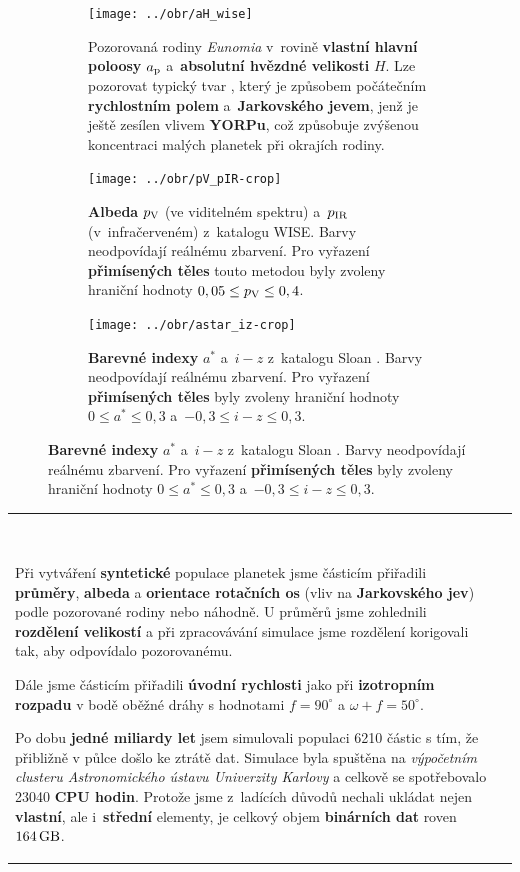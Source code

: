 \documentclass{beamer}
\newlength{\vyska}
\newlength{\vyskaB}
\newlength{\main}
\begin{document}
\begin{frame}
\begin{columns}[t]
\begin{column}{\main}
\begin{tcolorbox}[title=Výsledky\phantom{Úy},height=\vyskaB]
\begin{figure}[!htb]
\begin{subfigure}[b]{0.3\textwidth}
			\label{fig:ae_ai_wise}
		\end{subfigure}
		\begin{subfigure}[b]{0.26\textwidth}
			\centering
			\texttt{[image: ../obr/aH\_wise]}
			\caption{Pozorovaná rodiny \textit{Eunomia} v~rovině \textbf{vlastní hlavní poloosy} $a_{\rm p}$ a~\textbf{absolutní hvězdné velikosti} $H$. Lze pozorovat typický tvar , který je způsobem počátečním \textbf{rychlostním polem} a~\textbf{Jarkovského jevem}, jenž je ještě zesílen vlivem \textbf{YORPu}, což způsobuje zvýšenou koncentraci malých planetek při okrajích rodiny.}
		\end{subfigure}
		\begin{subfigure}[b]{0.2\textwidth}
			\centering
			\texttt{[image: ../obr/pV\_pIR-crop]}
			\caption{\textbf{Albeda} $p_{\rm V}$ (ve viditelném spektru) a~$p_{\rm IR}$ (v~infračerveném) z~katalogu WISE. Barvy neodpovídají reálnému zbarvení. Pro vyřazení \textbf{přimísených těles} touto metodou byly zvoleny hraniční hodnoty $0,05 \leq p_{\rm V} \leq 0,4$.}
		\end{subfigure}
		\begin{subfigure}[b]{0.2\textwidth}
			\centering
			\texttt{[image: ../obr/astar\_iz-crop]}
			\caption{\textbf{Barevné indexy} $a^*$ a~$i-z$ z~katalogu Sloan \cite{ivezic01}. Barvy neodpovídají reálnému zbarvení. Pro vyřazení \textbf{přimísených těles} byly zvoleny hraniční hodnoty $0\leq a^* \leq 0,3$ a~$-0,3\leq i-z \leq 0,3$.
}
		\end{subfigure}
	\end{figure}

	\begin{tabularx}{\textwidth}{p{}X}

\

Při vytváření \textbf{syntetické} populace planetek jsme částicím přiřadili \textbf{průměry}, \textbf{albeda} a \textbf{orientace rotačních os} (vliv na \textbf{Jarkovského jev}) podle pozorované rodiny nebo náhodně. U průměrů jsme zohlednili \textbf{rozdělení velikostí} a při zpracovávání simulace jsme rozdělení korigovali tak, aby odpovídalo pozorovanému.

Dále jsme částicím přiřadili \textbf{úvodní rychlosti} jako při \textbf{izotropním rozpadu} v bodě oběžné dráhy s hodnotami $f=90^\circ$ a $\omega+f=50^\circ$.

Po dobu \textbf{jedné miliardy let} jsem simulovali populaci 6210 částic s tím, že přibližně v půlce došlo ke ztrátě dat. Simulace byla spuštěna na \textit{výpočetním clusteru Astronomického ústavu Univerzity Karlovy} a celkově se spotřebovalo 23040 \textbf{CPU hodin}. Protože jsme z~ladících důvodů nechali ukládat nejen \textbf{vlastní}, ale i~\textbf{střední} elementy, je celkový objem \textbf{binárních dat} roven $164\,{\rm GB}$.


\end{tabularx}
\end{tcolorbox}
\end{column}
\end{columns}
\end{frame}
\end{document}
